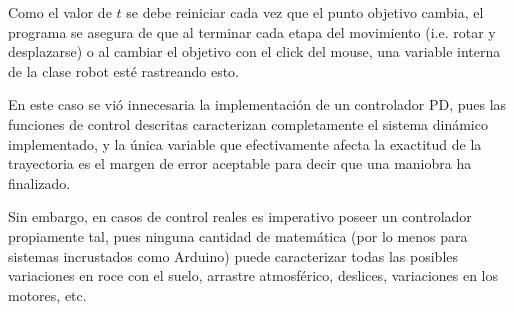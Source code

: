 \documentclass[11pt,letterpaper,twoside]{report}%
\begin{document}
Como el valor de $t$ se debe reiniciar cada vez que el punto objetivo cambia, el programa se asegura de que al terminar cada etapa del movimiento (i.e. rotar y desplazarse) o al cambiar el objetivo con el click del mouse, una variable interna de la clase robot est\'e rastreando esto.



En este caso se vi\'o innecesaria la implementaci\'on de un controlador PD, pues las funciones de control descritas caracterizan completamente el sistema din\'amico implementado, y la \'unica variable que efectivamente afecta la exactitud de la trayectoria es el margen de error aceptable para decir que una maniobra ha finalizado.

Sin embargo, en casos de control reales es imperativo poseer un controlador propiamente tal, pues ninguna cantidad de matem\'atica (por lo menos para sistemas incrustados como Arduino) puede caracterizar todas las posibles variaciones en roce con el suelo, arrastre atmosf\'erico, deslices, variaciones en los motores, etc.

\printbibliography
\end{document}
